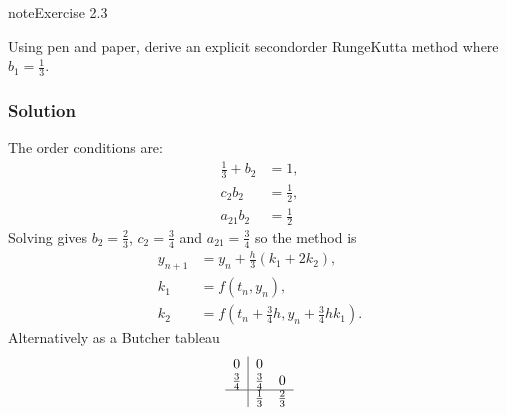 \documentclass[letterpaper,10pt,english]{jupyterBook}
\begin{document}
\begin{sphinxadmonition}{note}{Exercise 2.3}

\sphinxAtStartPar
Using pen and paper, derive an explicit second\sphinxhyphen{}order Runge\sphinxhyphen{}Kutta method where \(b_1 =\frac{1}{3}\).
\subsubsection*{Solution}

\sphinxAtStartPar
The order conditions are:
\begin{align*}
    \frac{1}{3} + b_2 &=1,\\
    c_2 b_2 &=\frac{1}{2},\\
    a_{21} b_2 &=\frac{1}{2}
\end{align*}
\sphinxAtStartPar
Solving gives \(b_2 = \frac{2}{3}\), \(c_2=\frac{3}{4}\) and \(a_{21} = \frac{3}{4}\) so the method is
\begin{align*}
    y_{n+1} &= y_n + \frac{h}{3}(k_1 + 2k_2), \\
    k_1 &= f(t_n, y_n), \\
    k_2 &= f(t_n + \tfrac{3}{4}h, y_n + \tfrac{3}{4}h k_1).
\end{align*}
\sphinxAtStartPar
Alternatively as a Butcher tableau
\begin{align*}
    \begin{array}{c|cc}
    0 & 0 \\
    \frac{3}{4} & \frac{3}{4} & 0 \\ \hline
    & \frac{1}{3} & \frac{2}{3}
    \end{array}
\end{align*}\end{sphinxadmonition}
\end{document}
